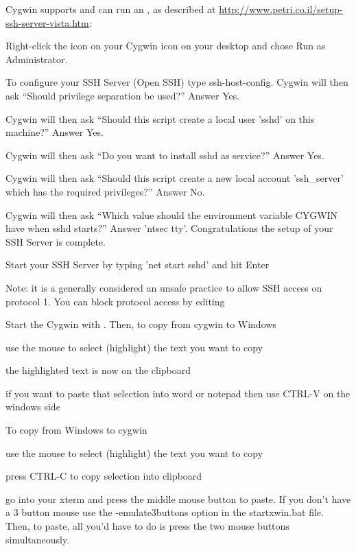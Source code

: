 \documentclass[12pt,twoside]{article}
\begin{document}
Cygwin supports  and can run an , as
described at \url{http://www.petri.co.il/setup-ssh-server-vista.htm}:
\begin{enumerate*}
\item Right-click the icon on your Cygwin icon on your desktop and chose Run as Administrator.
\item To configure your SSH Server (Open SSH) type ssh-host-config. Cygwin will then ask ``Should privilege separation be used?'' Answer Yes.
\item Cygwin will then ask ``Should this script create a local user 'sshd' on this machine?'' Answer Yes.
\item Cygwin will then ask ``Do you want to install sshd as service?'' Answer Yes.
\item Cygwin will then ask ``Should this script create a new local account 'ssh\_server' which has the required privileges?'' Answer No.
\item Cygwin will then ask ``Which value should the environment variable CYGWIN have when sshd starts?'' Answer 'ntsec tty'. Congratulations the setup of your SSH Server is complete.
\item Start your SSH Server by typing 'net start sshd' and hit Enter
\item Note: it is a generally considered an unsafe practice to allow SSH access on protocol 1. You can block protocol access by editing 
\end{enumerate*}

Start the Cygwin  with .
Then, to copy from cygwin to Windows
\begin{enumerate*}
\item use the mouse to select (highlight) the text you want to copy
\item the highlighted text is now on the clipboard
\item if you want to paste that selection into word or notepad then use CTRL-V on the windows side
\end{enumerate*}

To copy from Windows to cygwin
\begin{enumerate*}
\item use the mouse to select (highlight) the text you want to copy
\item press CTRL-C to copy selection into clipboard
\item go into your xterm and press the middle mouse button to paste. If you don't have a
3 button mouse use the -emulate3buttons option in the startxwin.bat file. Then, to paste, all you'd have to do is press the two mouse buttons simultaneously.
\end{enumerate*}
\end{document}
